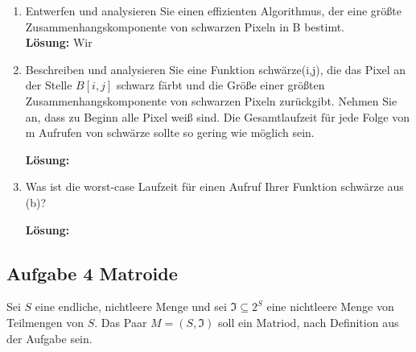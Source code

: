 \documentclass[11pt,a4paper,ngerman]{article}
\begin{document}
\begin{enumerate}[\bfseries (a)]

\item Entwerfen und analysieren Sie einen effizienten Algorithmus, der eine größte Zusammenhangskomponente von schwarzen Pixeln in B bestimt.\\

\textbf{Lösung:}
Wir 

\item Beschreiben und analysieren Sie eine Funktion schwärze(i,j), die das Pixel an der Stelle $B[i,j]$ schwarz färbt und die Größe einer größten Zusammenhangskomponente von schwarzen Pixeln zurückgibt. Nehmen Sie an, dass zu Beginn alle Pixel weiß sind. Die Gesamtlaufzeit für jede Folge von m Aufrufen von schwärze sollte so gering wie möglich sein.

\textbf{Lösung:}

\item Was ist die worst-case Laufzeit für einen Aufruf Ihrer Funktion schwärze aus (b)?

\textbf{Lösung:}

\end{enumerate}

\subsection*{Aufgabe 4 \mdseries Matroide}

Sei $S$ eine endliche, nichtleere Menge und sei $\mathfrak{I} \subseteq 2^S$ eine nichtleere Menge von Teilmengen von $S$. Das Paar $M = (S, \mathfrak{I})$ soll ein Matriod, nach Definition aus der Aufgabe sein.
\end{document}
